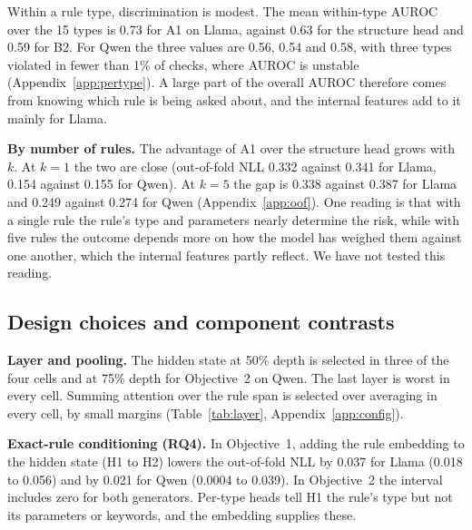\documentclass[10pt]{article}
\begin{document}
Within a rule type, discrimination is modest. The mean within-type AUROC over the 15 types is 0.73 for A1 on Llama,
against 0.63 for the structure head and 0.59 for B2. For Qwen the three values are 0.56, 0.54 and 0.58, with three
types violated in fewer than 1\% of checks, where AUROC is unstable (Appendix~\ref{app:pertype}). A large part of the
overall AUROC therefore comes from knowing which rule is being asked about, and the internal features add to it mainly
for Llama.

\textbf{By number of rules.} The advantage of A1 over the structure head grows with $k$. At $k=1$ the two are close
(out-of-fold NLL 0.332 against 0.341 for Llama, 0.154 against 0.155 for Qwen). At $k=5$ the gap is 0.338 against 0.387
for Llama and 0.249 against 0.274 for Qwen (Appendix~\ref{app:oof}). One reading is that with a single rule the rule's type and parameters nearly determine the risk, while with five
rules the outcome depends more on how the model has weighed them against one another, which the internal features
partly reflect. We have not tested this reading.

\subsection{Design choices and component contrasts}

\begin{table}[t]
\centering\small
\caption{Hidden-state probe alone, attention probe alone and both together (cross-validation loss; Objective~2 in units
of $10^{-2}$). The last column is the relative change of the combination against the better of the two single probes.}
\label{tab:comp}

\end{table}

\textbf{Layer and pooling.} The hidden state at 50\% depth is selected in three of the four cells and at 75\% depth for
Objective~2 on Qwen. The last layer is worst in every cell. Summing attention over the rule span is selected over
averaging in every cell, by small margins (Table~\ref{tab:layer}, Appendix~\ref{app:config}).

\textbf{Exact-rule conditioning (RQ4).} In Objective~1, adding the rule embedding to the hidden state (H1 to H2)
lowers the out-of-fold NLL by 0.037 for Llama (0.018 to 0.056) and by 0.021 for Qwen (0.0004 to 0.039). In Objective~2
the interval includes zero for both generators. Per-type heads tell H1 the rule's type but not its parameters or
keywords, and the embedding supplies these.
\end{document}
